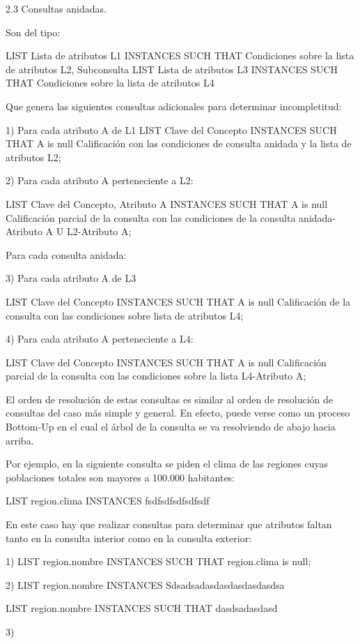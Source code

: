 2.3 Consultas anidadas.

Son del tipo:

LIST Lista de atributos L1 INSTANCES
SUCH THAT Condiciones sobre la lista de atributos L2, Subconsulta LIST Lista de atributos L3 INSTANCES
SUCH THAT Condiciones sobre la lista de atributos L4 

	Que genera las siguientes consultas adicionales para determinar incompletitud:

1) Para cada atributo A de L1
LIST Clave del Concepto INSTANCES
SUCH THAT A is null  Calificación con las condiciones de consulta anidada y la lista de atributos L2;

2)  Para cada atributo A perteneciente a L2:

LIST Clave del Concepto, Atributo A INSTANCES
SUCH THAT A is null  Calificación parcial de la consulta con las condiciones de la consulta anidada-{Atributo A} U L2-{Atributo A};

Para cada consulta anidada:

3) Para cada atributo A de L3

LIST Clave del Concepto INSTANCES
SUCH THAT A is null  Calificación de la consulta con las condiciones sobre lista de atributos L4;

4)  Para cada atributo A perteneciente a L4:

LIST Clave del Concepto INSTANCES
SUCH THAT A is null  Calificación parcial de la consulta con las condiciones sobre la lista L4-{Atributo A};

	El orden de resolución de estas consultas es similar al orden de resolución de consultas del caso más simple y general. En efecto, puede verse como un proceso Bottom-Up en el cual el árbol de la consulta se va resolviendo de abajo hacia arriba.

Por ejemplo, en la siguiente consulta se piden el clima de las regiones cuyas poblaciones totales son mayores a 100.000 habitantes:

LIST region.clima INSTANCES
fsdfsdfsdfsdfsdf

En este caso hay que realizar consultas para determinar que atributos faltan tanto en la consulta interior como en la consulta exterior:

1) LIST region.nombre INSTANCES
SUCH THAT region.clima is null;

2) LIST region.nombre INSTANCES
Sdsadsadasdasdasdasdasdsa

LIST region.nombre INSTANCES SUCH THAT
dasdsadasdasd

3)

